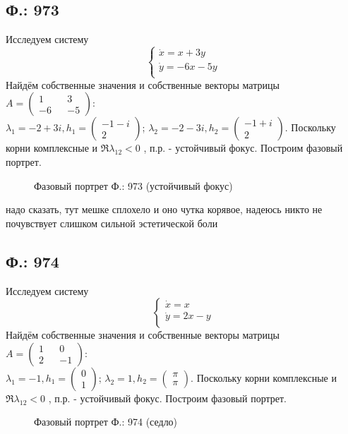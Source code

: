 \documentclass{article}
\begin{document}
\subsection{Ф.: 973}
Исследуем систему 
\begin{equation}
\begin{cases}
        \dot{x}=x+3y\\
        \dot{y}=-6x-5y\\
    \end{cases}    
\end{equation}
Найдём собственные значения и собственные векторы матрицы $A=\begin{pmatrix}1 && 3\\ -6 && -5 \end{pmatrix}$:\\
 $\lambda_1= -2+3i,h_1 = \begin{pmatrix} -1-i  \\  2 \end{pmatrix} $; $\lambda_2= -2-3i,h_2 = \begin{pmatrix} -1+i  \\  2 \end{pmatrix} $. Поскольку корни комплексные и $\Re{\lambda_{12}}<0$ , п.р. - устойчивый фокус. Построим фазовый портрет.
 \begin{figure}[ht]
\caption{Фазовый портрет Ф.: 973 (устойчивый фокус)}
\label{973}
\end{figure}
\textcolor[rgb]{1,1,1}{надо сказать, тут мешке сплохело и оно чутка корявое, надеюсь никто не почувствует слишком сильной эстетической боли}


\subsection{Ф.: 974}
Исследуем систему 
\begin{equation}
\begin{cases}
        \dot{x}=x\\
        \dot{y}=2x-y\\
    \end{cases}    
\end{equation}
Найдём собственные значения и собственные векторы матрицы $A=\begin{pmatrix}1 && 0 \\ 2 && -1 \end{pmatrix}$:\\
 $\lambda_1= -1,h_1 = \begin{pmatrix} 0  \\  1 \end{pmatrix} $; $\lambda_2= 1,h_2 = \begin{pmatrix} \pi  \\  \pi \end{pmatrix} $. Поскольку корни комплексные и $\Re{\lambda_{12}}<0$ , п.р. - устойчивый фокус. Построим фазовый портрет.
 \begin{figure}[ht]
\caption{Фазовый портрет Ф.: 974 (седло)}
\label{974}
\end{figure}\\
\end{document}
